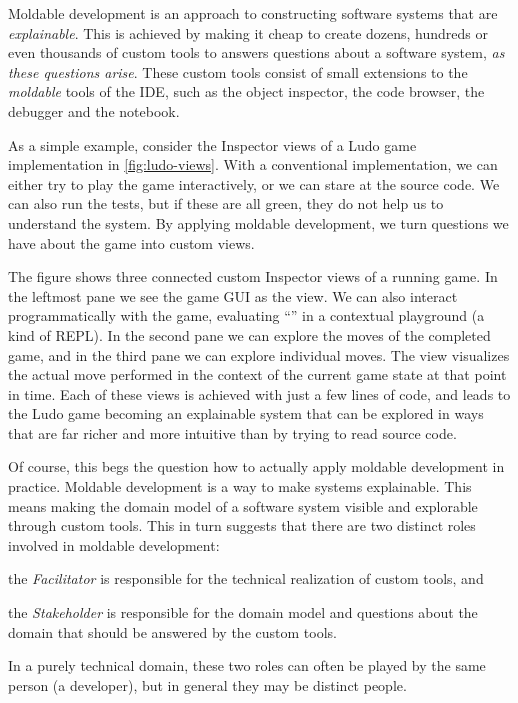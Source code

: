 \documentclass[sigconf]{acmart}
\begin{document}
Moldable development is an approach to constructing software systems that are \emph{explainable}.
This is achieved by making it cheap to create dozens, hundreds or even thousands of custom tools to answers questions about a software system, \emph{as these questions arise}.
These custom tools consist of small extensions to the \emph{moldable} tools of the IDE, such as the object inspector, the code browser, the debugger and the notebook.

As a simple example, consider the Inspector views of a Ludo game implementation in \autoref{fig:ludo-views}.
With a conventional implementation, we can either try to play the game interactively, or we can stare at the source code.
We can also run the tests, but if these are all green, they do not help us to understand the system.
By applying moldable development, we turn questions we have about the game into custom views.

The figure shows three connected custom Inspector views of a running game.
In the leftmost pane we see the game GUI as the  view.
We can also interact programmatically with the game, evaluating ``'' in a contextual playground (a kind of REPL).
In the second pane we can explore the moves of  the completed game, and in the third pane we can explore individual moves.
The  view visualizes the actual move performed in the context of the current game state at that point in time.
Each of these views is achieved with just a few lines of code, and leads to the Ludo game becoming an explainable system that can be explored in ways that are far richer and more intuitive than by trying to read source code.

Of course, this begs the question how to actually apply moldable development in practice.
Moldable development is a way to make systems explainable.
This means making the domain model of a software system visible and explorable through custom tools.
This in turn suggests that there are two distinct roles involved in moldable development:
\begin{inparaenum}[(i)]
\item the \emph{Facilitator} is responsible for the technical realization of custom tools, and
\item the \emph{Stakeholder} is responsible for the domain model and questions about the domain that should be answered by the custom tools.
\end{inparaenum}
In a purely technical domain, these two roles can often be played by the same person (\ie a developer), but in general they may be distinct people.
\end{document}
